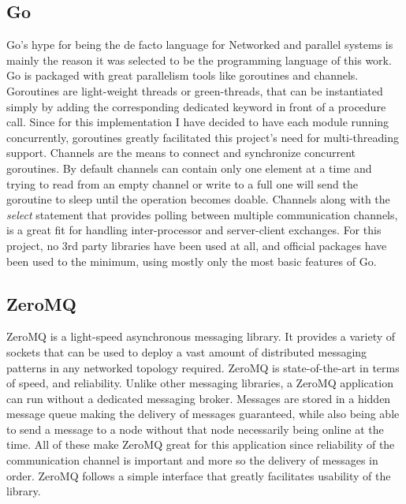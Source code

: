 \documentclass[12pt,a4paper]{report}
\begin{document}
		    \subsection{Go}
		    Go's hype for being the de facto language for Networked and parallel systems is mainly the reason
		    it was selected to be the programming language of this work. Go is packaged with great parallelism tools like goroutines and channels. Goroutines are light-weight threads or green-threads, that can be instantiated simply by adding the corresponding dedicated keyword in front of a procedure call. Since for this implementation I have decided to have each module running concurrently, goroutines greatly facilitated this project's need for multi-threading support. Channels are the means to connect and synchronize concurrent goroutines. By default channels can contain only one element at a time and trying to read from an empty channel or write to a full one will send the goroutine to sleep until the operation becomes doable. Channels along with the \textit{select} statement that provides polling between multiple communication channels, is a great fit for handling inter-processor and server-client exchanges. For this project, no 3rd party libraries have been used at all, and official packages have been used to the minimum, using mostly only the most basic features of Go. 
		    		

		    \subsection{ZeroMQ}
		    ZeroMQ is a light-speed asynchronous messaging library. It provides a variety of sockets that can be used to deploy a vast amount of distributed messaging patterns in any networked topology required. ZeroMQ is state-of-the-art in terms of speed, and reliability. Unlike other messaging libraries, a ZeroMQ application can run without a dedicated messaging broker. Messages are stored in a hidden message queue making the delivery of messages guaranteed, while also being able to send a message to a node without that node necessarily being online at the time. All of these make ZeroMQ great for this application since reliability of the communication channel is important and more so the delivery of messages in order. ZeroMQ follows a simple interface that greatly facilitates usability of the library.
		    		
\end{document}
